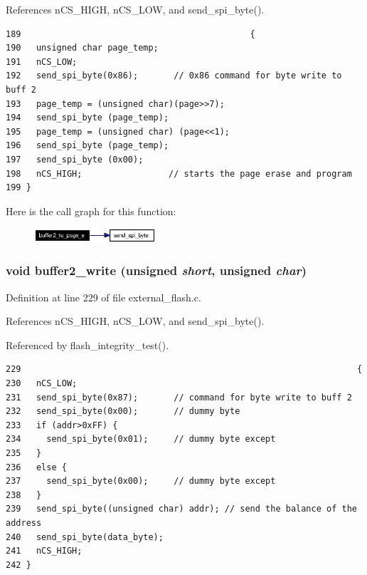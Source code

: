 References n\-CS\_\-HIGH, n\-CS\_\-LOW, and send\_\-spi\_\-byte().

\footnotesize\begin{verbatim}189                                             {
190   unsigned char page_temp;
191   nCS_LOW;
192   send_spi_byte(0x86);       // 0x86 command for byte write to buff 2
193   page_temp = (unsigned char)(page>>7);
194   send_spi_byte (page_temp);
195   page_temp = (unsigned char) (page<<1);
196   send_spi_byte (page_temp);
197   send_spi_byte (0x00);
198   nCS_HIGH;                 // starts the page erase and program 
199 }
\end{verbatim}\normalsize 




Here is the call graph for this function:\begin{figure}[H]
\begin{center}
\leavevmode
\includegraphics[width=128pt]{external__flash_8h_a11_cgraph}
\end{center}
\end{figure}
\subsubsection{\setlength{\rightskip}{0pt plus 5cm}void buffer2\_\-write (unsigned {\em short}, unsigned {\em char})}\label{external__flash_8h_a14}




Definition at line 229 of file external\_\-flash.c.

References n\-CS\_\-HIGH, n\-CS\_\-LOW, and send\_\-spi\_\-byte().

Referenced by flash\_\-integrity\_\-test().

\footnotesize\begin{verbatim}229                                                                  {
230   nCS_LOW;
231   send_spi_byte(0x87);       // command for byte write to buff 2
232   send_spi_byte(0x00);       // dummy byte
233   if (addr>0xFF) {
234     send_spi_byte(0x01);     // dummy byte except 
235   }
236   else {
237     send_spi_byte(0x00);     // dummy byte except 
238   }  
239   send_spi_byte((unsigned char) addr); // send the balance of the address
240   send_spi_byte(data_byte);
241   nCS_HIGH; 
242 }
\end{verbatim}\normalsize 




